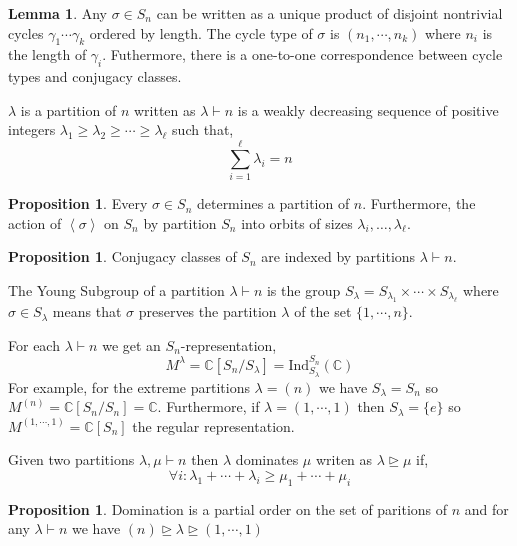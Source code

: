 \documentclass[12pt]{extarticle}
\newcommand{\C}{\mathbb{C}}
\newcommand{\Ind}[3]{\mathrm{Ind}_{#2}^{#1}\left(#3\right)}
\theoremstyle{definition}
\newtheorem{lemma}[theorem]{Lemma}
\newtheorem{proposition}[theorem]{Proposition}
\newenvironment{definition}[1][Definition:]{\begin{trivlist}
\item[\hskip \labelsep {\bfseries #1}]}{\end{trivlist}}
\begin{document}
\begin{lemma}
Any $\sigma \in S_n$ can be written as a unique product of disjoint nontrivial cycles $\gamma_1 \cdots \gamma_k$ ordered by length. The cycle type of $\sigma$ is $(n_1, \cdots, n_k)$ where $n_i$ is the length of $\gamma_i$. Futhermore, there is a one-to-one correspondence between cycle types and conjugacy classes. 
\end{lemma}

\begin{definition}
$\lambda$ is a partition of $n$ written as $\lambda \vdash n$ is a weakly decreasing sequence of positive integers $\lambda_1 \ge \lambda_2 \ge \cdots \ge \lambda_{\ell}$ such that,
\[ \sum_{i = 1}^{\ell} \lambda_i = n \] 
\end{definition}

\begin{proposition}
Every $\sigma \in S_n$ determines a partition of $n$. Furthermore, the action of $\left< \sigma \right>$ on $S_n$ by partition $S_n$ into orbits of sizes $\lambda_i, \dots, \lambda_{\ell}$. 
\end{proposition}

\begin{proposition}
Conjugacy classes of $S_n$ are indexed by partitions $\lambda \vdash n$.
\end{proposition}

\begin{definition}
The Young Subgroup of a partition $\lambda \vdash n$ is the group $S_{\lambda} = S_{\lambda_1} \times \cdots \times S_{\lambda_{\ell}}$ where $\sigma \in S_{\lambda}$ means that $\sigma$ preserves the partition $\lambda$ of the set $\{1, \cdots, n \}$. 
\end{definition}

\begin{definition}
For each $\lambda \vdash n$ we get an $S_n$-representation,
\[ M^\lambda = \C[S_n/S_\lambda] = \Ind{S_n}{S_{\lambda}}{\C} \]
For example, for the extreme partitions $\lambda = (n)$ we have $S_\lambda = S_n$ so $M^{(n)} = \C[S_n/S_n] = \C$. Furthermore, if $\lambda = (1, \cdots, 1)$ then $S_{\lambda} = \{e\}$ so $M^{(1, \cdots, 1)} = \C[S_n]$ the regular representation. 
\end{definition}

\newcommand{\dom}{\trianglerighteq}

\begin{definition}
Given two partitions $\lambda, \mu \vdash n$ then $\lambda$ dominates $\mu$ writen as $\lambda \dom \mu$ if,
\[ \forall i : \lambda_1 + \cdots + \lambda_i \ge \mu_1 + \cdots + \mu_i \]
\end{definition}

\begin{proposition}
Domination is a partial order on the set of paritions of $n$ and for any $\lambda \vdash n$ we have
$(n) \dom \lambda \dom (1, \cdots, 1)$ 
\end{proposition}
\end{document}
